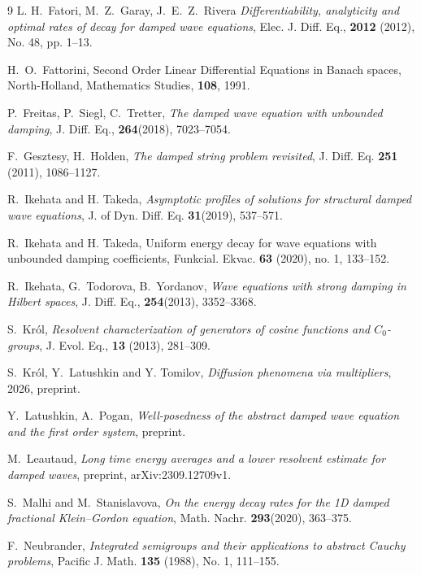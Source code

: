 \documentclass[11pt]{amsart}
\numberwithin{equation}{section}
\theoremstyle{remark}
\theoremstyle{definition}
\begin{document}
\begin{thebibliography}{9}
	 L. H.\ Fatori, M.\ Z.\ Garay, J.\ E.\ Z.\ Rivera \textit{Differentiability, analyticity and optimal rates of decay for damped wave equations}, Elec. J. Diff. Eq.,  \textbf{2012} (2012), No. 48, pp. 1--13. 
	
	 H.\ O.\ Fattorini, Second Order Linear Differential Equations in Banach spaces, North-Holland, Mathematics Studies, \textbf{108}, 1991.
	
	 P.\ Freitas, P.\ Siegl, C.\ Tretter, \textit{The damped wave equation with unbounded damping}, J. Diff. Eq., \textbf{264}(2018), 7023--7054.
	
	 F.\ Gesztesy,  H.\ Holden, \textit{The damped string problem revisited}, J. Diff. Eq. \textbf{251} (2011), 1086--1127.
	
	
 R.\ Ikehata and H. Takeda, \textit{Asymptotic profiles of solutions for structural damped wave
equations}, 
J. of Dyn. Diff. Eq. \textbf{31}(2019), 537--571.
	
	 R.\ Ikehata and H. Takeda, Uniform energy decay for wave equations with unbounded damping coefficients, Funkcial. Ekvac. \textbf{63} (2020), no. 1, 133--152.
	
	 R.\ Ikehata, G.\ Todorova,  B.\ Yordanov, \textit{Wave equations with strong damping in Hilbert spaces}, J. Diff. Eq., \textbf{254}(2013),  3352--3368.
	
	 S.\ Kr\'{o}l, \textit{Resolvent characterization of generators of cosine functions and $C_0$-groups}, J. Evol. Eq., \textbf{13} (2013), 281--309.
	
	 S.\ Kr\'{o}l, Y.\ Latushkin and Y. Tomilov, \textit{Diffusion phenomena via multipliers}, 2026, preprint.
	
	 Y.\ Latushkin, A.\ Pogan, \textit{Well-posedness of the abstract damped wave equation and the first order system}, preprint.
	
	 M.\ Leautaud, \textit{Long time energy averages and a lower resolvent estimate for damped waves}, preprint,  arXiv:2309.12709v1.
	
	 S.\ Malhi and M.\ Stanislavova, \textit{On the energy decay rates for the 1D damped fractional Klein–Gordon equation}, Math. Nachr. \textbf{293}(2020), 363--375.
	
	 F.\ Neubrander, \textit{Integrated semigroups and their applications to abstract Cauchy problems}, Pacific J. Math. \textbf{135} (1988), No. 1, 111--155.
	

\end{thebibliography}
\end{document}
